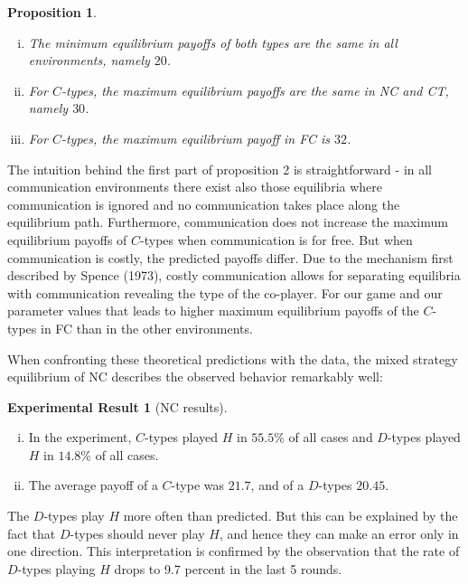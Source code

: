 \documentclass[12pt]{article}
\newtheorem{proposition}{Proposition} \theoremstyle{definition}
\theoremstyle{break}
\newtheorem{result}{Experimental Result}\theoremstyle{break}
\begin{document}
\begin{proposition}\label{prop:compare-payoffs}
	\begin{enumerate}[i)]\setlength\itemsep{0em}
		\item The minimum equilibrium payoffs of both types are the same in all environments, namely $20$. 
		\item For $C$-types, the maximum equilibrium payoffs are the same in NC and CT, namely $30$.
		\item For $C$-types, the maximum equilibrium payoff in FC is $32$.
	\end{enumerate}
\end{proposition}

The intuition behind the first part of proposition 2 is straightforward - in all communication environments there exist also those equilibria where communication is ignored and no communication takes place along the equilibrium path. Furthermore, communication does not increase the maximum equilibrium payoffs of $C$-types when communication is for free. But when communication is costly, the predicted payoffs differ. Due to the mechanism first described by Spence (1973), costly communication allows for separating equilibria with communication revealing the type of the co-player. For our game and our parameter values that leads to higher maximum equilibrium payoffs of the $C$-types in FC than in the other environments.

When confronting these theoretical predictions with the data, the mixed strategy equilibrium of NC describes the observed behavior remarkably well:

\begin{result}[NC results]
	\begin{enumerate}[i)]\setlength\itemsep{0em}
		\item In the experiment, $C$-types played $H$ in $55.5\%$ of all cases and $D$-types played $H$ in $14.8\%$ of all cases.
		\item The average payoff of a $C$-type was $21.7$, and of a $D$-types $20.45$.
	\end{enumerate}
\end{result}


The $D$-types play $H$ more often than predicted. But this can be explained by the fact that $D$-types should never play $H$, and hence they can make an error only in one direction. This interpretation is confirmed by the observation that the rate of $D$-types playing $H$ drops to 9.7 percent in the last 5 rounds.
\end{document}
